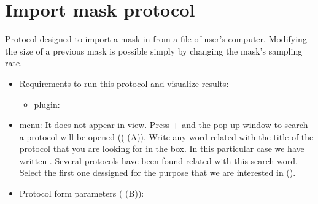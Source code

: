 \section{Import mask protocol}
\label{app:importMask}%
Protocol designed to import a mask in \scipion from a file of user's computer. Modifying the size of a previous mask is possible simply by changing the mask's sampling rate.
   
 \begin{itemize}
        \item Requirements to run this protocol and visualize results:
                \begin{itemize}
                    \item \scipion plugin: 
                \end{itemize}
        \item \scipion menu:
            It does not appear in  view.
            Press  +  and the pop up window to search a protocol will be opened (( (A)). Write any word related with the title of the protocol that you are looking for in the  box. In this particular case we have written . Several protocols have been found related with this search word. Select the first one dessigned for the purpose that we are interested in ().
  
        \item Protocol form parameters ( (B)):
  

\end{itemize}
